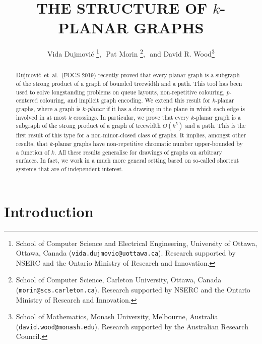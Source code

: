 \documentclass{patmorin}
\title{\MakeUppercase{The Structure of $k$-Planar Graphs}}
\author{Vida Dujmovi\'c%
        \thanks{School of Computer Science and Electrical Engineering,
                University of Ottawa, Ottawa, Canada (\texttt{vida.dujmovic@uottawa.ca}).
                Research  supported by NSERC and the Ontario Ministry of Research and Innovation.},\,\,
        Pat Morin%
        \thanks{School of Computer Science, Carleton University, Ottawa, Canada (\texttt{morin@scs.carleton.ca}).                 Research  supported by NSERC and the Ontario Ministry of Research and Innovation.},\,\, and
        David R. Wood\thanks{School of Mathematics, Monash University, Melbourne, Australia (\texttt{david.wood@monash.edu}). Research supported by the Australian Research Council.}
}
\begin{document}
\begin{titlepage}
\maketitle

\begin{abstract}
Dujmovi\'c~et~al.~(FOCS 2019) recently proved that every planar graph is a subgraph of the strong product of a graph of bounded treewidth and a path. This tool has been used to solve longstanding problems on queue layouts, non-repetitive colouring, $p$-centered colouring, and implicit graph encoding. We extend this result for $k$-planar graphs, where a graph is \emph{$k$-planar} if it has a drawing in the plane in which each edge is involved in at most $k$ crossings. In particular, we prove that every $k$-planar graph is a subgraph of the strong product of a graph of treewidth $O(k^5)$ and a path. This is the first result of this type for a non-minor-closed class of graphs. It implies, amongst other results, that $k$-planar graphs have non-repetitive chromatic number upper-bounded by a function of $k$. All these results generalise for drawings of graphs on arbitrary surfaces. In fact, we work in a much more general setting based on so-called shortcut systems that are of independent interest. 
\end{abstract}
\end{titlepage}
\tableofcontents
\newpage

\section{Introduction}
\label{Introduction}
\end{document}
